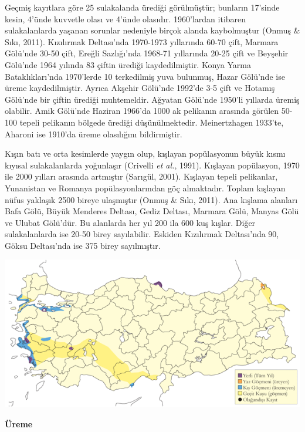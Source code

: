 \documentclass[
  a4paper,
  DIV=11,
  numbers=noendperiod]{scrreprt}
\begin{document}
Geçmiş kayıtlara göre 25 sulakalanda ürediği görülmüştür; bunların
17'sinde kesin, 4'ünde kuvvetle olası ve 4'ünde olasıdır. 1960'lardan
itibaren sulakalanlarda yaşanan sorunlar nedeniyle birçok alanda
kaybolmuştur (Onmuş \& Sıkı, 2011). Kızılırmak Deltası'nda 1970-1973
yıllarında 60-70 çift, Marmara Gölü'nde 30-50 çift, Ereğli Sazlığı'nda
1968-71 yıllarında 20-25 çift ve Beyşehir Gölü'nde 1964 yılında 83
çiftin ürediği kaydedilmiştir. Konya Yarma Bataklıkları'nda 1970'lerde
10 terkedilmiş yuva bulunmuş, Hazar Gölü'nde ise üreme kaydedilmiştir.
Ayrıca Akşehir Gölü'nde 1992'de 3-5 çift ve Hotamış Gölü'nde bir çiftin
ürediği muhtemeldir. Ağyatan Gölü'nde 1950'li yıllarda üremiş olabilir.
Amik Gölü'nde Haziran 1966'da 1000 ak pelikanın arasında görülen 50-100
tepeli pelikanın bölgede ürediği düşünülmektedir. Meinertzhagen 1933'te,
Aharoni ise 1910'da üreme olasılığını bildirmiştir.

Kışın batı ve orta kesimlerde yaygın olup, kışlayan popülasyonun büyük
kısmı kıyısal sulakalanlarda yoğunlaşır (Crivelli \emph{et al.}, 1991).
Kışlayan popülasyon, 1970 ile 2000 yılları arasında artmıştır (Sarıgül,
2001). Kışlayan tepeli pelikanlar, Yunanistan ve Romanya
popülasyonlarından göç almaktadır. Toplam kışlayan nüfus yaklaşık 2500
bireye ulaşmıştır (Onmuş \& Sıkı, 2011). Ana kışlama alanları Bafa Gölü,
Büyük Menderes Deltası, Gediz Deltası, Marmara Gölü, Manyas Gölü ve
Ulubat Gölü'dür. Bu alanlarda her yıl 200 ila 600 kuş kışlar. Diğer
sulakalanlarda ise 20-50 birey sayılabilir. Eskiden Kızılırmak
Deltası'nda 90, Göksu Deltası'nda ise 375 birey sayılmıştır.

\includegraphics{images/harita_Page_075.png}

\textbf{Üreme}
\end{document}
